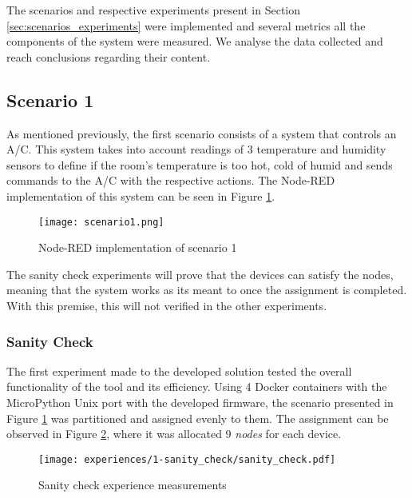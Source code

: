 The scenarios and respective experiments present in Section \ref{sec:scenarios_experiments} were implemented and several metrics all the components of the system were measured. We analyse the data collected and reach conclusions regarding their content.

\subsection{Scenario 1}\label{sec:discussion_scenario1}

As mentioned previously, the first scenario consists of a system that controls an A/C. This system takes into account readings of 3 temperature and humidity sensors to define if the room's temperature is too hot, cold of humid and sends commands to the A/C with the respective actions. The Node-RED implementation of this system can be seen in Figure \ref{fig:scenario1_node_red}.

\begin{figure}[h]
\centering
\texttt{[image: scenario1.png]}
\caption[Node-RED implementation of scenario 1]{Node-RED implementation of scenario 1}\label{fig:scenario1_node_red}
\end{figure}

The sanity check experiments will prove that the devices can satisfy the nodes, meaning that the system works as its meant to once the assignment is completed. With this premise, this will not verified in the other experiments.


\subsubsection{Sanity Check}\label{sec:sanity_check_exp}

The first experiment made to the developed solution tested the overall functionality of the tool and its efficiency. Using 4 Docker containers with the MicroPython Unix port with the developed firmware, the scenario presented in Figure \ref{fig:scenario1_node_red} was partitioned and assigned evenly to them. The assignment can be observed in Figure \ref{fig:sanity_check_graph}, where it was allocated 9 \textit{nodes} for each device.

\begin{figure}[h]
\centering
\texttt{[image: experiences/1-sanity\_check/sanity\_check.pdf]}
\caption[Sanity check experience measurements]{Sanity check experience measurements}\label{fig:sanity_check_graph}
\end{figure}

